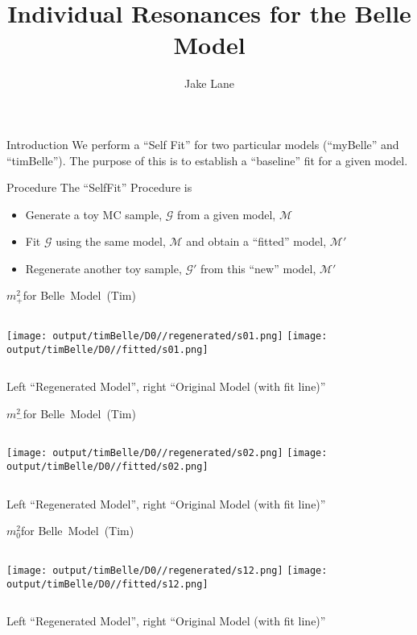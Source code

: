 \documentclass{beamer}
\author{Jake Lane}
\title{Individual Resonances for the Belle Model}
\newcommand{\MP}{\ensuremath{m^2_+}}
\newcommand{\MM}{\ensuremath{m^2_-}}
\newcommand{\MZ}{\ensuremath{m^2_0}}
\begin{document}
\begin{frame}{Introduction}
We perform a ``Self Fit'' for two particular models (``myBelle'' and ``timBelle''). 
The purpose of this is to establish a ``baseline'' fit for a given model.
\end{frame}
\begin{frame}{Procedure}
The ``SelfFit'' Procedure is
\begin{itemize}
\item Generate a toy MC sample, $\mathcal{G}$ from a given model, $\mathcal{M}$
\item Fit $\mathcal{G}$ using the same model, $\mathcal{M}$ and obtain a ``fitted'' model, $\mathcal{M}'$
\item Regenerate another toy sample, $\mathcal{G}'$ from this ``new'' model, $\mathcal{M}'$
\end{itemize}
\end{frame}

\begin{frame}{\MP for Belle\ Model\ (Tim)}
\begin{columns}[t]
\centering
\texttt{[image: output/timBelle/D0//regenerated/s01.png]}
\centering
\texttt{[image: output/timBelle/D0//fitted/s01.png]}
\end{columns}
    \centering
    Left ``Regenerated Model'', right ``Original Model (with fit line)''
\end{frame}                   

\begin{frame}{\MM for Belle\ Model\ (Tim)}
\begin{columns}[t]
\centering
\texttt{[image: output/timBelle/D0//regenerated/s02.png]}
\centering
\texttt{[image: output/timBelle/D0//fitted/s02.png]}
\end{columns}
    \centering
    Left ``Regenerated Model'', right ``Original Model (with fit line)''
\end{frame}                   

\begin{frame}{\MZ for Belle\ Model\ (Tim)}
\begin{columns}[t]
\centering
\texttt{[image: output/timBelle/D0//regenerated/s12.png]}
\centering
\texttt{[image: output/timBelle/D0//fitted/s12.png]}
\end{columns}
    \centering
    Left ``Regenerated Model'', right ``Original Model (with fit line)''
\end{frame}                   
\end{document}
